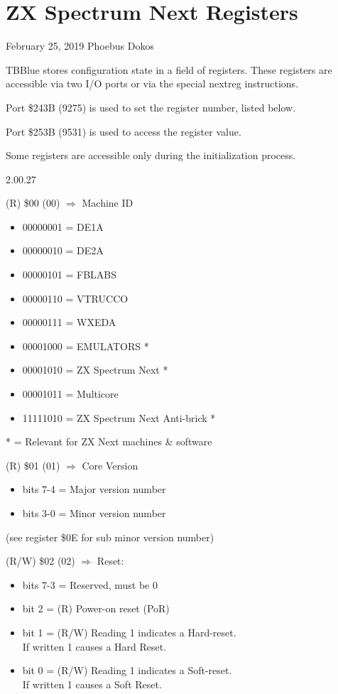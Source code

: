 \section{ZX Spectrum Next Registers}
February 25, 2019  Phoebus Dokos

TBBlue stores configuration state in a field of registers. These
registers are accessible via two I/O ports or via the special nextreg
instructions.

Port \$243B (9275) is used to set the register number, listed below.

Port \$253B (9531) is used to access the register value.

Some registers are accessible only during the initialization process.

2.00.27

(R) \$00 (00) $\Rightarrow$ Machine ID
\begin{itemize}
\item[] 00000001 = DE1A
\item[] 00000010 = DE2A
\item[] 00000101 = FBLABS
\item[] 00000110 = VTRUCCO
\item[] 00000111 = WXEDA
\item[] 00001000 = EMULATORS *
\item[] 00001010 = ZX Spectrum Next *
\item[] 00001011 = Multicore
\item[] 11111010 = ZX Spectrum Next Anti-brick *
\end{itemize}
* = Relevant for ZX Next machines \& software

(R) \$01 (01) $\Rightarrow$ Core Version
\begin{itemize}
\item[] bits 7-4 = Major version number
\item[] bits 3-0 = Minor version number
\end{itemize}
(see register \$0E for sub minor version number)

(R/W) \$02 (02) $\Rightarrow$ Reset:
\begin{itemize}
\item[] bits 7-3 = Reserved, must be 0
\item[] bit 2 = (R) Power-on reset (PoR)
\item[] bit 1 = (R/W) Reading 1 indicates a Hard-reset.\\
  If written 1 causes a Hard Reset.
\item[] bit 0 = (R/W) Reading 1 indicates a Soft-reset.\\
  If written 1 causes a Soft Reset.
\end{itemize}

